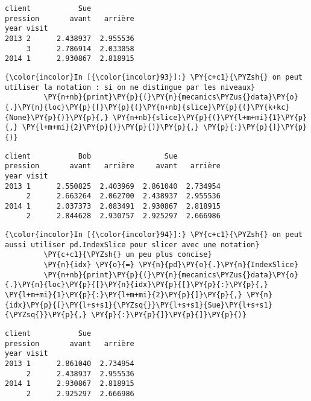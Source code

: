     \begin{Verbatim}[commandchars=\\\{\}]
client           Sue          
pression       avant   arrière
year visit                    
2013 2      2.438937  2.955536
     3      2.786914  2.033058
2014 1      2.930867  2.818915

    \end{Verbatim}

    \begin{Verbatim}[commandchars=\\\{\}]
{\color{incolor}In [{\color{incolor}93}]:} \PY{c+c1}{\PYZsh{} on peut utiliser la notation : si on ne distingue par les niveaux}
         \PY{n+nb}{print}\PY{p}{(}\PY{n}{mecanics\PYZus{}data}\PY{o}{.}\PY{n}{loc}\PY{p}{[}\PY{p}{(}\PY{n+nb}{slice}\PY{p}{(}\PY{k+kc}{None}\PY{p}{)}\PY{p}{,} \PY{n+nb}{slice}\PY{p}{(}\PY{l+m+mi}{1}\PY{p}{,} \PY{l+m+mi}{2}\PY{p}{)}\PY{p}{)}\PY{p}{,} \PY{p}{:}\PY{p}{]}\PY{p}{)}
\end{Verbatim}


    \begin{Verbatim}[commandchars=\\\{\}]
client           Bob                 Sue          
pression       avant   arrière     avant   arrière
year visit                                        
2013 1      2.550825  2.403969  2.861040  2.734954
     2      2.663264  2.062700  2.438937  2.955536
2014 1      2.037373  2.083491  2.930867  2.818915
     2      2.844628  2.930757  2.925297  2.666986

    \end{Verbatim}

    \begin{Verbatim}[commandchars=\\\{\}]
{\color{incolor}In [{\color{incolor}94}]:} \PY{c+c1}{\PYZsh{} on peut aussi utiliser pd.IndexSlice pour slicer avec une notation}
         \PY{c+c1}{\PYZsh{} un peu plus concise}
         \PY{n}{idx} \PY{o}{=} \PY{n}{pd}\PY{o}{.}\PY{n}{IndexSlice}
         \PY{n+nb}{print}\PY{p}{(}\PY{n}{mecanics\PYZus{}data}\PY{o}{.}\PY{n}{loc}\PY{p}{[}\PY{n}{idx}\PY{p}{[}\PY{p}{:}\PY{p}{,} \PY{l+m+mi}{1}\PY{p}{:}\PY{l+m+mi}{2}\PY{p}{]}\PY{p}{,} \PY{n}{idx}\PY{p}{[}\PY{l+s+s1}{\PYZsq{}}\PY{l+s+s1}{Sue}\PY{l+s+s1}{\PYZsq{}}\PY{p}{,} \PY{p}{:}\PY{p}{]}\PY{p}{]}\PY{p}{)}
\end{Verbatim}


    \begin{Verbatim}[commandchars=\\\{\}]
client           Sue          
pression       avant   arrière
year visit                    
2013 1      2.861040  2.734954
     2      2.438937  2.955536
2014 1      2.930867  2.818915
     2      2.925297  2.666986

    \end{Verbatim}

